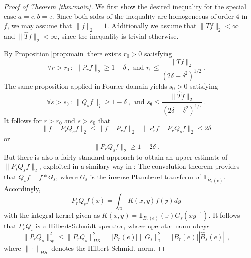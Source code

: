 \documentclass[12pt, reqno]{amsart}
\begin{document}
\begin{proof}[Proof of Theorem \ref{thm:main}]
We first show the desired inequality for the special case $a=e, b=e$. Since both sides of the inequality are homogeneous of order 4 in $f$, we may assume that $\| f \|_2 = 1$. Additionally we assume that $\| T f \|_2 < \infty$ and $\| \widehat{T} f \|_2< \infty$, since the inequality is trivial otherwise. 

By Proposition \ref{prop:main} there exists $r_0>0$ satisfying 
\begin{equation} \label{eqn:r_0}
\forall r> r_0 \,:\, \| P_{r} f \|_2 \ge 1 - \delta~, \mbox{ and } r_0 \le \frac{\| T f \|_2}{\left(2 \delta - \delta^2 \right)^{1/2}}~.
\end{equation} The same proposition applied in Fourier domain yields $s_0 >0$ satisfying
\begin{equation} \label{eqn:s_0}
\forall s > s_0 \,:\, \| Q_{s} f \|_2 \ge 1 - \delta~, \mbox{ and } s_0 \le \frac{\| \widehat{T} f \|_2}{\left(2 \delta - \delta^2 \right)^{1/2}}~.
\end{equation} It follows for $r>r_0$ and $s>s_0$ that 
\[
\| f- P_{r} Q_{s} f \|_2 \le \| f - P_{r} f \|_2 + \| P_{r} f  - P_{r} Q_{s} f \|_2 \le 2 \delta
\]
or
\begin{equation} \label{eqn:PQf}
\| P_{r} Q_{s} f \|_2 \ge 1 - 2 \delta~.
\end{equation}
But there is also a fairly standard approach to obtain an upper estimate of $\| P_{r} Q_{s} f \|_2$, exploited in a similary way in \cite{MR997928}: The convolution theorem provides that $Q_s f = f \ast G_s$, where $G_s$ is the inverse Plancherel transform of $\mathbf{1}_{\widehat{B}_s(e)}$. Accordingly, 
\[
P_r Q_s f(x) = \int_G K(x,y) f(y) dy
\]
with the integral kernel given as $K(x,y) = \mathbf{1}_{B_r(e)}(x) G_s(xy^{-1})$. It follows that $P_r Q_s$ is a Hilbert-Schmidt operator, whose operator norm obeys
\[ \| P_r Q_s \|_{op}^2 \le \| P_r Q_s \|_{HS}^2 =  |B_r(e)| \|G_s \|_2^2 = |B_{r}(e)| |\widehat{B}_{s}(e)| \,\,,
\]
where $\| \cdot \|_{HS}$ denotes the Hilbert-Schmidt norm. 


\end{proof}
\end{document}
